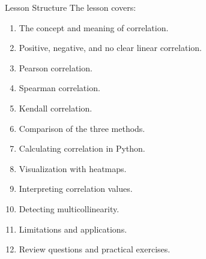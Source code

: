 \documentclass[aspectratio=169,11pt]{beamer}
\begin{document}
\begin{frame}[allowframebreaks]{Lesson Structure}
\small
The lesson covers:\par\medskip
\begin{enumerate}
\item The concept and meaning of correlation.
\item Positive, negative, and no clear linear correlation.
\item Pearson correlation.
\item Spearman correlation.
\item Kendall correlation.
\item Comparison of the three methods.
\item Calculating correlation in Python.
\item Visualization with heatmaps.
\item Interpreting correlation values.
\item Detecting multicollinearity.
\item Limitations and applications.
\item Review questions and practical exercises.
\end{enumerate}
\end{frame}
\end{document}
